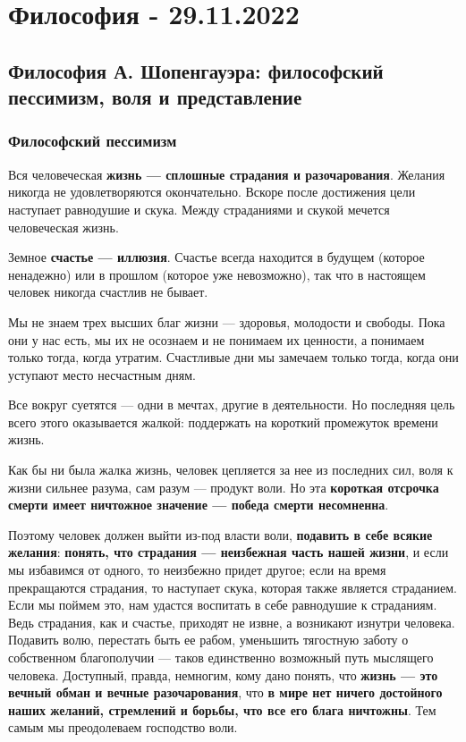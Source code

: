 \documentclass{article}
\begin{document}
\pagebreak
\section{Философия - 29.11.2022}

\subsection{Философия А. Шопенгауэра: философский пессимизм, воля и представление}

\subsubsection{Философский пессимизм}

\begin{flushleft}

Вся человеческая \textbf{жизнь — сплошные страдания и разочарования}. Желания никогда не удовлетворяются окончательно. Вскоре после достижения цели наступает равнодушие и скука. Между страданиями и скукой мечется человеческая жизнь.

Земное \textbf{счастье — иллюзия}. Счастье всегда находится в будущем (которое ненадежно) или в прошлом (которое уже невозможно), так что в настоящем человек никогда счастлив не бывает.

Мы не знаем трех высших благ жизни — здоровья, молодости и свободы. Пока они у нас есть, мы их не осознаем и не понимаем их ценности, а понимаем только тогда, когда утратим. Счастливые дни мы замечаем только тогда, когда они уступают место несчастным дням.

Все вокруг суетятся — одни в мечтах, другие в деятельности. Но последняя цель всего этого оказывается жалкой: поддержать на короткий промежуток времени жизнь.

Как бы ни была жалка жизнь, человек цепляется за нее из последних сил, воля к жизни сильнее разума, сам разум — продукт воли. Но эта \textbf{короткая отсрочка смерти имеет ничтожное значение — победа смерти несомненна}.

Поэтому человек должен выйти из-под власти воли, \textbf{подавить в себе всякие желания}: \textbf{понять, что страдания — неизбежная часть нашей жизни}, и если мы избавимся от одного, то неизбежно придет другое; если на время прекращаются страдания, то наступает скука, которая также является страданием. Если мы поймем это, нам удастся воспитать в себе равнодушие к страданиям. Ведь страдания, как и счастье, приходят не извне, а возникают изнутри человека. Подавить волю, перестать быть ее рабом, уменьшить тягостную заботу о собственном благополучии — таков единственно возможный путь мыслящего человека. Доступный, правда, немногим, кому дано понять, что \textbf{жизнь — это вечный обман и вечные разочарования}, что \textbf{в мире нет ничего достойного наших желаний, стремлений и борьбы, что все его блага ничтожны}. Тем самым мы преодолеваем господство воли.


\end{flushleft}
\end{document}
